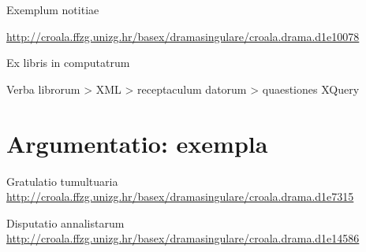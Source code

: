 \documentclass[14pt]{beamer}
\begin{document}
\begin{frame}{Exemplum notitiae}

  \url{http://croala.ffzg.unizg.hr/basex/dramasingulare/croala.drama.d1e10078}
  
\end{frame}

{
    \begin{frame}[plain]
    \end{frame}
    }

\begin{frame}{Ex libris in computatrum}

Verba librorum > XML > receptaculum datorum > quaestiones XQuery

\end{frame}

{
    \begin{frame}[plain]
    \end{frame}
    }
\section{Argumentatio: exempla}

\begin{frame}{Gratulatio tumultuaria}
  \url{http://croala.ffzg.unizg.hr/basex/dramasingulare/croala.drama.d1e7315}
\end{frame}

\begin{frame}{Disputatio annalistarum}
  \url{http://croala.ffzg.unizg.hr/basex/dramasingulare/croala.drama.d1e14586}
\end{frame}
\end{document}
